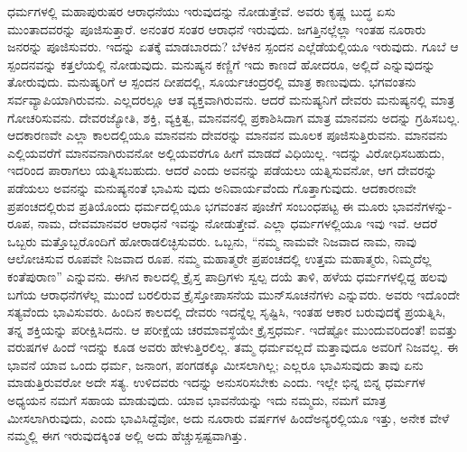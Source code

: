 ಧರ್ಮಗಳಲ್ಲಿ ಮಹಾಪುರುಷರ ಆರಾಧನೆಯು ಇರುವುದನ್ನು ನೋಡುತ್ತೇವೆ. ಅವರು ಕೃಷ್ಣ ಬುದ್ಧ ಏಸು ಮುಂತಾದವರನ್ನು ಪೂಜಿಸುತ್ತಾರೆ. ಅನಂತರ ಸಂತರ ಆರಾಧನೆ ಇರುವುದು. ಜಗತ್ತಿನಲ್ಲೆಲ್ಲಾ ಇಂತಹ ನೂರಾರು ಜನರನ್ನು ಪೂಜಿಸುವರು. ಇದನ್ನು ಏತಕ್ಕೆ ಮಾಡಬಾರದು? ಬೆಳಕಿನ ಸ್ಪಂದನ ಎಲ್ಲೆಡೆಯಲ್ಲಿಯೂ ಇರುವುದು. ಗೂಬೆ ಆ ಸ್ಪಂದನವನ್ನು ಕತ್ತಲೆಯಲ್ಲಿ ನೋಡುವುದು. ಮನುಷ್ಯನ ಕಣ್ಣಿಗೆ ಇದು ಕಾಣದೆ ಹೋದರೂ, ಅಲ್ಲಿದೆ ಎನ್ನುವುದನ್ನು ತೋರುವುದು. ಮನುಷ್ಯರಿಗೆ ಆ ಸ್ಪಂದನ ದೀಪದಲ್ಲಿ, ಸೂರ್ಯಚಂದ್ರರಲ್ಲಿ ಮಾತ್ರ ಕಾಣುವುದು. ಭಗವಂತನು ಸರ್ವವ್ಯಾಪಿಯಾಗಿರುವನು. ಎಲ್ಲದರಲ್ಲೂ ಆತ ವ್ಯಕ್ತವಾಗಿರುವನು. ಆದರೆ ಮನುಷ್ಯನಿಗೆ ದೇವರು ಮನುಷ್ಯನಲ್ಲಿ ಮಾತ್ರ ಗೋಚರಿಸುವನು. ದೇವರಜ್ಯೋತಿ, ಶಕ್ತಿ, ವ್ಯಕ್ತಿತ್ವ, ಮಾನವನಲ್ಲಿ ಪ್ರಕಾಶಿಸಿದಾಗ ಮಾತ್ರ ಮಾನವನು ಅದನ್ನು ಗ್ರಹಿಸಬಲ್ಲ. ಆದಕಾರಣವೇ ಎಲ್ಲಾ ಕಾಲದಲ್ಲಿಯೂ ಮಾನವನು ದೇವರನ್ನು ಮಾನವನ ಮೂಲಕ ಪೂಜಿಸುತ್ತಿರುವನು. ಮಾನವನು ಎಲ್ಲಿಯವರೆಗೆ ಮಾನವನಾಗಿರುವನೋ ಅಲ್ಲಿಯವರೆಗೂ ಹೀಗೆ ಮಾಡದೆ ವಿಧಿಯಿಲ್ಲ. ಇದನ್ನು ವಿರೋಧಿಸಬಹುದು, ಇದರಿಂದ ಪಾರಾಗಲು ಯತ್ನಿಸಬಹುದು. ಆದರೆ ಎಂದು ಅವನನ್ನು ಪಡೆಯಲು ಯತ್ನಿಸುವನೋ, ಆಗ ದೇವರನ್ನು ಪಡೆಯಲು ಅವನನ್ನು ಮನುಷ್ಯನಂತೆ ಭಾವಿಸು ವುದು ಅನಿವಾರ್ಯವೆಂದು ಗೊತ್ತಾಗುವುದು. ಆದಕಾರಣವೇ ಪ್ರಪಂಚದಲ್ಲಿರುವ ಪ್ರತಿಯೊಂದು ಧರ್ಮದಲ್ಲಿಯೂ ಭಗವಂತನ ಪೂಜೆಗೆ ಸಂಬಂಧಪಟ್ಟ ಈ ಮೂರು ಭಾವನೆಗಳನ್ನು-ರೂಪ, ನಾಮ, ದೇವಮಾನವರ ಆರಾಧನೆ ಇವನ್ನು ನೋಡುತ್ತೇವೆ. ಎಲ್ಲಾ ಧರ್ಮಗಳಲ್ಲಿಯೂ ಇವು ಇವೆ. ಆದರೆ ಒಬ್ಬರು ಮತ್ತೊಬ್ಬರೊಂದಿಗೆ ಹೋರಾಡಲಿಚ್ಛಿಸುವರು. ಒಬ್ಬನು, “ನಮ್ಮ ನಾಮವೇ ನಿಜವಾದ ನಾಮ, ನಾವು ಆಲೋಚಿಸುವ ರೂಪವೇ ನಿಜವಾದ ರೂಪ. ನಮ್ಮ ಮಹಾತ್ಮರೇ ಪ್ರಪಂಚದಲ್ಲಿ ಉತ್ತಮ ಮಹಾತ್ಮರು, ನಿಮ್ಮದೆಲ್ಲ ಕಂತೆಪುರಾಣ” ಎನ್ನುವನು. ಈಗಿನ ಕಾಲದಲ್ಲಿ ಕ್ರೈಸ್ತ ಪಾದ್ರಿಗಳು ಸ್ವಲ್ಪ ದಯೆ ತಾಳಿ, ಹಳೆಯ ಧರ್ಮಗಳಲ್ಲಿದ್ದ ಹಲವು ಬಗೆಯ ಆರಾಧನೆಗಳೆಲ್ಲ ಮುಂದೆ ಬರಲಿರುವ ಕ್ರೈಸ್ತೋಪಾಸನೆಯ ಮುನ್​ಸೂಚನೆಗಳು ಎನ್ನುವರು. ಅವರು ಇದೊಂದೇ ಸತ್ಯವೆಂದು ಭಾವಿಸುವರು. ಹಿಂದಿನ ಕಾಲದಲ್ಲಿ ದೇವರು ಇದನ್ನೆಲ್ಲ ಸೃಷ್ಟಿಸಿ, ಇಂತಹ ಆಕಾರ ಬರುವುದಕ್ಕೆ ಪ್ರಯತ್ನಿಸಿ, ತನ್ನ ಶಕ್ತಿಯನ್ನು ಪರೀಕ್ಷಿಸಿದನು. ಆ ಪರೀಕ್ಷೆಯ ಚರಮಾವಸ್ಥೆಯೇ ಕ್ರೈಸ್ತಧರ್ಮ. ಇದೆಷ್ಟೋ ಮುಂದುವರಿದಂತೆ! ಐವತ್ತು ವರುಷ\-ಗಳ ಹಿಂದೆ ಇದನ್ನು ಕೂಡ ಅವರು ಹೇಳುತ್ತಿರಲಿಲ್ಲ. ತಮ್ಮ ಧರ್ಮವಲ್ಲದೆ ಮತ್ತಾವುದೂ ಅವರಿಗೆ ನಿಜವಲ್ಲ. ಈ ಭಾವನೆ ಯಾವ ಒಂದು ಧರ್ಮ, ಜನಾಂಗ, ಪಂಗಡಕ್ಕೂ ಮೀಸಲಾಗಿಲ್ಲ; ಎಲ್ಲರೂ ಭಾವಿಸುವುದು ತಾವು ಏನು ಮಾಡುತ್ತಿರುವರೋ ಅದೇ ಸತ್ಯ. ಉಳಿದವರು ಇದನ್ನು ಅನುಸರಿಸಬೇಕು ಎಂದು. ಇಲ್ಲೇ ಭಿನ್ನ ಬಿನ್ನ ಧರ್ಮಗಳ ಅಧ್ಯಯನ ನಮಗೆ ಸಹಾಯ ಮಾಡುವುದು. ಯಾವ ಭಾವನೆಯನ್ನು ಇದು ನಮ್ಮದು, ನಮಗೆ ಮಾತ್ರ ಮೀಸಲಾಗಿರುವುದು, ಎಂದು ಭಾವಿಸಿದ್ದೆವೋ, ಅದು ನೂರಾರು ವರ್ಷಗಳ ಹಿಂದೆ\break ಅನ್ಯರಲ್ಲಿಯೂ ಇತ್ತು, ಅನೇಕ ವೇಳೆ ನಮ್ಮಲ್ಲಿ ಈಗ ಇರುವುದಕ್ಕಿಂತ ಅಲ್ಲಿ ಅದು ಹೆಚ್ಚು\break ಸ್ಪಷ್ಟವಾಗಿತ್ತು.

